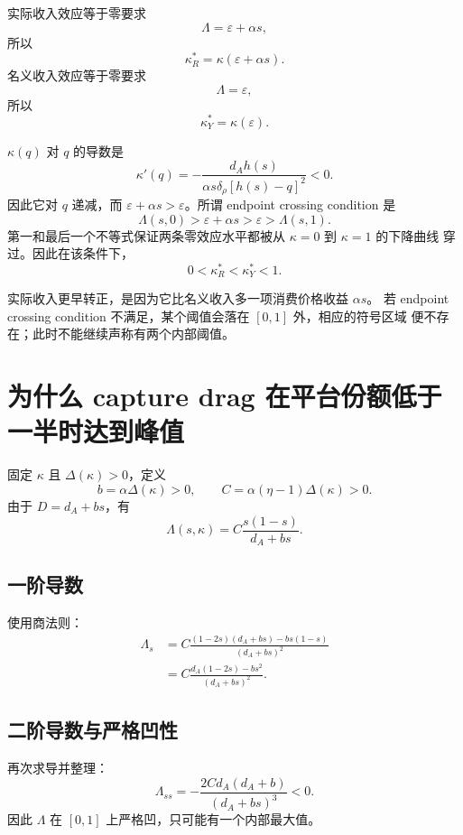 \documentclass[UTF8,11pt,scheme=chinese,fontset=fandol]{ctexart}
\theoremstyle{definition}
\begin{document}
实际收入效应等于零要求
\[
\Lambda=\varepsilon+\alpha s,
\]
所以
\[
\kappa_R^*=\kappa(\varepsilon+\alpha s).
\]
名义收入效应等于零要求
\[
\Lambda=\varepsilon,
\]
所以
\[
\kappa_Y^*=\kappa(\varepsilon).
\]

\(\kappa(q)\) 对 \(q\) 的导数是
\[
\kappa'(q)
=-\frac{d_Ah(s)}
{\alpha s\delta_\rho[h(s)-q]^2}<0.
\]
因此它对 \(q\) 递减，而 \(\varepsilon+\alpha s>\varepsilon\)。所谓 endpoint
crossing condition 是
\[
\Lambda(s,0)>
\varepsilon+\alpha s>
\varepsilon>
\Lambda(s,1).
\]
第一和最后一个不等式保证两条零效应水平都被从 \(\kappa=0\) 到 \(\kappa=1\) 的下降曲线
穿过。因此在该条件下，
\begin{equation}
0<\kappa_R^*<\kappa_Y^*<1.
\label{teach:eq:ordered-thresholds}
\end{equation}

实际收入更早转正，是因为它比名义收入多一项消费价格收益 \(\alpha s\)。
若 endpoint crossing condition 不满足，某个阈值会落在 \([0,1]\) 外，相应的符号区域
便不存在；此时不能继续声称有两个内部阈值。

\section{为什么 capture drag 在平台份额低于一半时达到峰值}

固定 \(\kappa\) 且 \(\Delta(\kappa)>0\)，定义
\[
b=\alpha\Delta(\kappa)>0,
\qquad
C=\alpha(\eta-1)\Delta(\kappa)>0.
\]
由于 \(D=d_A+bs\)，有
\begin{equation}
\Lambda(s,\kappa)=C\frac{s(1-s)}{d_A+bs}.
\label{teach:eq:Lambda-peak-form}
\end{equation}

\subsection{一阶导数}

使用商法则：
\begin{align}
\Lambda_s
&=C\frac{(1-2s)(d_A+bs)-bs(1-s)}{(d_A+bs)^2}\\
&=C\frac{d_A(1-2s)-bs^2}{(d_A+bs)^2}.
\label{teach:eq:Lambda-s}
\end{align}

\subsection{二阶导数与严格凹性}

再次求导并整理：
\begin{equation}
\Lambda_{ss}
=-\frac{2Cd_A(d_A+b)}{(d_A+bs)^3}<0.
\label{teach:eq:Lambda-ss}
\end{equation}
因此 \(\Lambda\) 在 \([0,1]\) 上严格凹，只可能有一个内部最大值。
\end{document}
